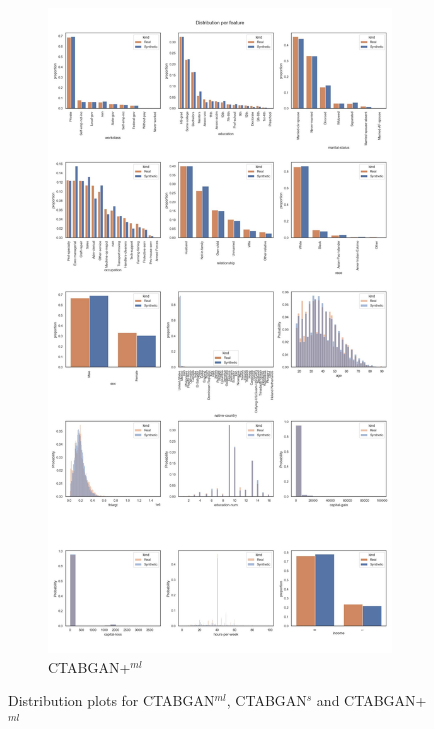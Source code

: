 \begin{landscape}
\begin{figure}[h]
\begin{subfigure}{0.3\linewidth}
			\includegraphics[height=\textheight,width=\linewidth,keepaspectratio]{images/distributions_full/ctabgan+.jpg}
			\caption{CTABGAN+$^{ml}$}
		\end{subfigure}
		\hfill
		\caption{Distribution plots for CTABGAN$^{ml}$, CTABGAN$^s$ and CTABGAN+$^{ml}$}
		\label{fig_a:dist_1}
	\end{figure}
\end{landscape}
